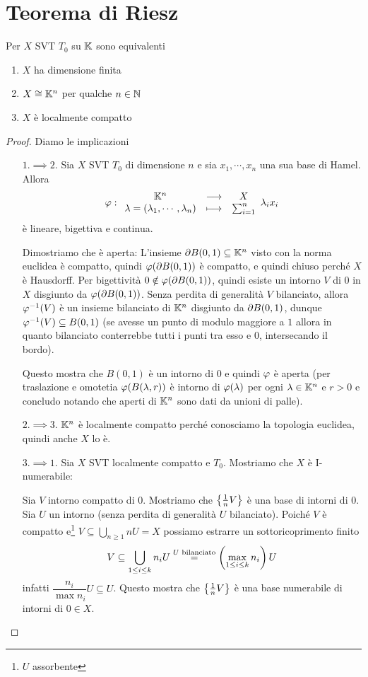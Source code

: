 \section{Teorema di Riesz}
\begin{theorem}[Riesz]\label{ThRiesz}
Per $X$ SVT $T_0$ su $\K$ sono equivalenti
\begin{enumerate}
    \item $X$ ha dimensione finita
    \item $X\cong \K^n$ per qualche $n\in\N$
    \item $X$ \`e localmente compatto
\end{enumerate}
\end{theorem}
\begin{proof}
    Diamo le implicazioni
\setlength{\leftmargini}{0cm}
\begin{itemize}
\item[$\boxed{1.\implies2.}$] Sia $X$ SVT $T_0$ di dimensione $n$ e sia $x_1,\cdots, x_n$ una sua base di Hamel. Allora
\[\vp:\funcDef{\K^n}{X}{\la=(\la_1,\cdots,\la_n)}{\sum_{i=1}^n}\la_i x_i\]
\`e lineare, bigettiva e continua. 

Dimostriamo che \`e aperta: L'insieme $\del B(0,1)\subseteq \K^n$ visto con la norma euclidea \`e compatto, quindi $\vp(\del B(0,1))$ \`e compatto, e quindi chiuso perch\'e $X$ \`e Hausdorff. Per bigettivit\`a $0\notin \vp(\del B(0,1))$, quindi esiste un intorno $V$ di $0$ in $X$ disgiunto da $\vp(\del B(0,1))$. Senza perdita di generalit\`a $V$ bilanciato, allora $\vp\ii(V)$ \`e un insieme bilanciato di $\K^n$ disgiunto da $\del B(0,1)$, dunque $\vp\ii(V)\subseteq B(0,1)$ (se avesse un punto di modulo maggiore a $1$ allora in quanto bilanciato conterrebbe tutti i punti tra esso e $0$, intersecando il bordo). 

Questo mostra che $B(0,1)$ \`e un intorno di $0$ e quindi $\vp$ \`e aperta (per traslazione e omotetia $\vp(B(\la,r))$ \`e intorno di $\vp(\la)$ per ogni $\la\in\K^n$ e $r>0$ e concludo notando che aperti di $\K^n$ sono dati da unioni di palle).
\item[$\boxed{2.\implies3.}$] $\K^n$ \`e localmente compatto perch\'e conosciamo la topologia euclidea, quindi anche $X$ lo \`e.
\item[$\boxed{3.\implies1.}$] Sia $X$ SVT localmente compatto e $T_0$. Mostriamo che $X$ \`e I-numerabile:

Sia $V$ intorno compatto di $0$. Mostriamo che $\cpa{\frac1n V}$ \`e una base di intorni di $0$. Sia $U$ un intorno (senza perdita di generalit\`a $U$ bilanciato). Poich\'e $V$ \`e compatto e\footnote{$U$ assorbente} $V\subseteq \bigcup_{n\geq 1}nU=X$ possiamo estrarre un sottoricoprimento finito
\[V\subseteq \bigcup_{1\leq i\leq k}n_i U\pasgnl={$U$ bilanciato}\pa{\max_{1\leq i\leq k}n_i}U\]
infatti $\dfrac{n_i}{\max n_i}U\subseteq U$. Questo mostra che $\cpa{\frac1n V}$ \`e una base numerabile di intorni di $0\in X$.



\end{itemize}
\end{proof}
